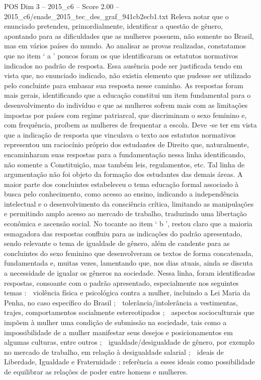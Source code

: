 \begin{textsample}{POS Dim 3 – 2015\_c6 – Score 2.00 – 2015\_c6/enade\_2015\_tec\_des\_graf\_941cb2ecb1.txt}
Releva notar que o enunciado pretendeu, primordialmente, identificar a questão de gênero, apontando para as dificuldades que as mulheres possuem, não somente no Brasil, mas em vários países do mundo.
Ao analisar as provas realizadas, constatamos que no item ‘ a ’ poucos foram os que identificaram os estatutos normativos indicados no padrão de resposta.
Essa ausência pode ser justificada tendo em vista que, no enunciado indicado, não existia elemento que pudesse ser utilizado pelo concluinte para embasar sua resposta nesse caminho.
As respostas foram mais gerais, identificando que a educação constitui um item fundamental para o desenvolvimento do indivíduo e que as mulheres sofrem mais com as limitações impostas por países com regime patriarcal, que discriminam o sexo feminino e, com frequência, proíbem as mulheres de frequentar a escola.
Deve -se ter em vista que a indicação de resposta que vinculava o texto aos estatutos normativos representou um raciocínio próprio dos estudantes de Direito que, naturalmente, encaminharam suas respostas para a fundamentação nessa linha identificando, não somente a Constituição, mas também leis, regulamentos, etc.
Tal linha de argumentação não foi objeto da formação dos estudantes das demais áreas.
A maior parte dos concluintes estabeleceu o tema educação formal associado à busca pelo conhecimento, como acesso ao ensino, indicando a independência intelectual e o desenvolvimento da consciência crítica, limitando as manipulações e permitindo amplo acesso ao mercado de trabalho, traduzindo uma libertação econômica e ascensão social.
No tocante ao item ‘ b ’, restou claro que a maioria esmagadora das respostas confluiu para as indicações do padrão apresentado, sendo relevante o tema de igualdade de gênero, além de candente para as concluintes do sexo feminino que desenvolveram os textos de forma concatenada, fundamentada e, muitas vezes, lamentando que, nos dias atuais, ainda se discuta a necessidade de igualar os gêneros na sociedade.
Nessa linha, foram identificadas respostas, consoante com o padrão apresentado, especialmente nos seguintes temas :  violência física e psicológica contra a mulher, incluindo a Lei Maria da Penha, no caso específico do Brasil ;  tolerância/intolerância a vestimentas, trajes, comportamentos socialmente estereotipados ;  aspectos socioculturais que impõem à mulher uma condição de submissão na sociedade, tais como a impossibilidade de a mulher manifestar seus desejos e posicionamentos em algumas culturas, entre outros ;  igualdade/desigualdade de gênero, por exemplo no mercado de trabalho, em relação à desigualdade salarial ;  ideais de Liberdade, Igualdade e Fraternidade : referência a esses ideais como possibilidade de equilibrar as relações de poder entre homens e mulheres.

\end{textsample}
